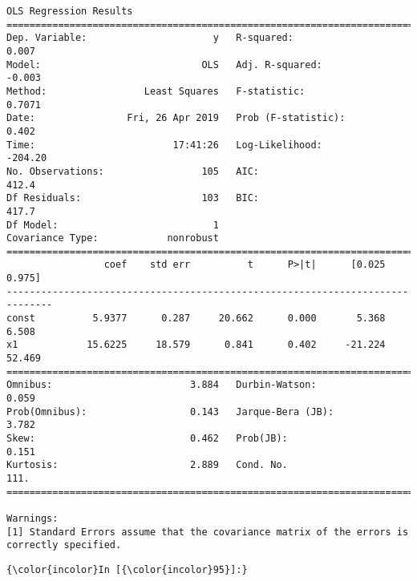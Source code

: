 \documentclass[11pt]{article}
\begin{document}
    \begin{Verbatim}[commandchars=\\\{\}]
                            OLS Regression Results                            
==============================================================================
Dep. Variable:                      y   R-squared:                       0.007
Model:                            OLS   Adj. R-squared:                 -0.003
Method:                 Least Squares   F-statistic:                    0.7071
Date:                Fri, 26 Apr 2019   Prob (F-statistic):              0.402
Time:                        17:41:26   Log-Likelihood:                -204.20
No. Observations:                 105   AIC:                             412.4
Df Residuals:                     103   BIC:                             417.7
Df Model:                           1                                         
Covariance Type:            nonrobust                                         
==============================================================================
                 coef    std err          t      P>|t|      [0.025      0.975]
------------------------------------------------------------------------------
const          5.9377      0.287     20.662      0.000       5.368       6.508
x1            15.6225     18.579      0.841      0.402     -21.224      52.469
==============================================================================
Omnibus:                        3.884   Durbin-Watson:                   0.059
Prob(Omnibus):                  0.143   Jarque-Bera (JB):                3.782
Skew:                           0.462   Prob(JB):                        0.151
Kurtosis:                       2.889   Cond. No.                         111.
==============================================================================

Warnings:
[1] Standard Errors assume that the covariance matrix of the errors is correctly specified.

    \end{Verbatim}

    \begin{Verbatim}[commandchars=\\\{\}]
{\color{incolor}In [{\color{incolor}95}]:} 
\end{Verbatim}
\end{document}
